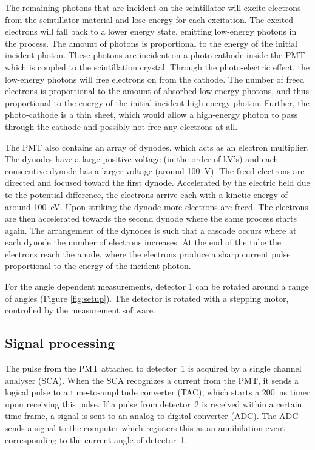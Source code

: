 The remaining photons that are incident on the scintillator will excite electrons from the scintillator material and lose energy for each excitation. The excited electrons will fall back to a lower energy state, emitting low-energy photons in the process. The amount of photons is proportional to the energy of the initial incident photon. These photons are incident on a photo-cathode inside the PMT which is coupled to the scintillation crystal. Through the photo-electric effect, the low-energy photons will free electrons on from the cathode. The number of freed electrons is proportional to the amount of absorbed low-energy photons, and thus proportional to the energy of the initial incident high-energy photon. Further, the photo-cathode is a thin sheet, which would allow a high-energy photon to pass through the cathode and possibly not free any electrons at all.

The PMT also contains an array of dynodes, which acts as an electron multiplier. The dynodes have a large positive voltage (in the order of kV's) and each consecutive dynode has a larger voltage (around 100~V). The freed electrons are directed and focused toward the first dynode. Accelerated by the electric field due to the potential difference, the electrons arrive each with a kinetic energy of around 100~eV. Upon striking the dynode more electrons are freed. The electrons are then accelerated towards the second dynode where the same process starts again. The arrangement of the dynodes is such that a cascade occurs where at each dynode the number of electrons increases. At the end of the tube the electrons reach the anode, where the electrons produce a sharp current pulse proportional to the energy of the incident photon.

For the angle dependent measurements, detector 1 can be rotated around a range of angles (Figure \ref{fig:setup}). The detector is rotated with a stepping motor, controlled by the measurement software.

\subsection*{Signal processing}
The pulse from the PMT attached to detector~1 is acquired by a single channel analyser (SCA). When the SCA recognizes a current from the PMT, it sends a logical pulse to a time-to-amplitude converter (TAC), which starts a 200~ns timer upon receiving this pulse. If a pulse from detector~2 is received within a certain time frame, a signal is sent to an analog-to-digital converter (ADC). The ADC sends a signal to the computer which registers this as an annihilation event corresponding to the current angle of detector~1.

